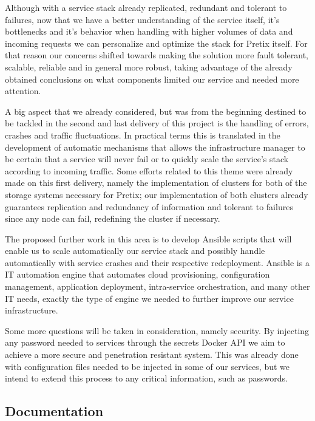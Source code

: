 \documentclass[12pt]{article}
\begin{document}

Although with a service stack already replicated, redundant and tolerant to failures, now that we have a better understanding of the service itself, it's bottlenecks and it's behavior when handling with higher volumes of data and incoming requests we can personalize and optimize the stack for Pretix itself. For that reason our concerns shifted towards making the solution more fault tolerant, scalable, reliable and in general more robust, taking advantage of the already obtained conclusions on what components limited our service and needed more attention.

A big aspect that we already considered, but was from the beginning destined to be tackled in the second and last delivery of this project is the handling of errors, crashes and traffic fluctuations. In practical terms this is translated in the development of automatic mechanisms that allows the infrastructure manager to be certain that a service will never fail or to quickly scale the service's stack according to incoming traffic. Some efforts related to this theme were already made on this first delivery, namely the implementation of clusters for both of the storage systems necessary for Pretix; our implementation of both clusters already guarantees replication and redundancy of information and tolerant to failures since any node can fail, redefining the cluster if necessary.

The proposed further work in this area is to develop Ansible scripts that will enable us to scale automatically our service stack and possibly handle automatically with service crashes and their respective redeployment. Ansible \cite{ansible} is a IT automation engine that automates cloud provisioning, configuration management, application deployment, intra-service orchestration, and many other IT needs, exactly the type of engine we needed to further improve our service infrastructure.

Some more questions will be taken in consideration, namely security. By injecting any password needed to services through the secrets Docker API we aim to achieve a more secure and penetration resistant system. This was already done with configuration files needed to be injected in some of our services, but we intend to extend this process to any critical information, such as passwords.


\subsection{Documentation} \label{remarks.documentation} %
\end{document}
